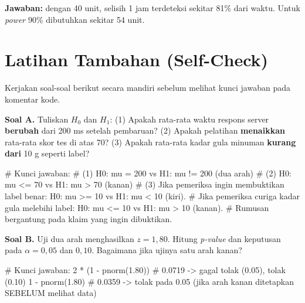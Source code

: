 \documentclass[
  indonesian,
  letterpaper,
]{book}
\newenvironment{Shaded}{\begin{snugshade}}{\end{snugshade}}
\newcommand{\CommentTok}[1]{\textcolor[rgb]{0.37,0.37,0.37}{#1}}
\newcommand{\DecValTok}[1]{\textcolor[rgb]{0.68,0.00,0.00}{#1}}
\newcommand{\FloatTok}[1]{\textcolor[rgb]{0.68,0.00,0.00}{#1}}
\newcommand{\FunctionTok}[1]{\textcolor[rgb]{0.28,0.35,0.67}{#1}}
\newcommand{\NormalTok}[1]{\textcolor[rgb]{0.00,0.23,0.31}{#1}}
\newcommand{\SpecialCharTok}[1]{\textcolor[rgb]{0.37,0.37,0.37}{#1}}
\begin{document}
\textbf{Jawaban:} dengan 40 unit, selisih 1 jam terdeteksi sekitar 81\%
dari waktu. Untuk \emph{power} 90\% dibutuhkan sekitar 54 unit.

\section{Latihan Tambahan
(Self-Check)}\label{latihan-tambahan-self-check-1}

Kerjakan soal-soal berikut secara mandiri sebelum melihat kunci jawaban
pada komentar kode.

\textbf{Soal A.} Tuliskan \(H_0\) dan \(H_1\): (1) Apakah rata-rata
waktu respons server \textbf{berubah} dari 200 ms setelah pembaruan? (2)
Apakah pelatihan \textbf{menaikkan} rata-rata skor tes di atas 70? (3)
Apakah rata-rata kadar gula minuman \textbf{kurang dari} 10 g seperti
label?

\begin{Shaded}
\begin{Highlighting}[]
\CommentTok{\# Kunci jawaban:}
\CommentTok{\# (1) H0: mu = 200 vs H1: mu != 200 (dua arah)}
\CommentTok{\# (2) H0: mu \textless{}= 70 vs H1: mu \textgreater{} 70 (kanan)}
\CommentTok{\# (3) Jika pemeriksa ingin membuktikan label benar: H0: mu \textgreater{}= 10 vs H1: mu \textless{} 10 (kiri).}
\CommentTok{\#     Jika pemeriksa curiga kadar gula melebihi label: H0: mu \textless{}= 10 vs H1: mu \textgreater{} 10 (kanan).}
\CommentTok{\#     Rumusan bergantung pada klaim yang ingin dibuktikan.}
\end{Highlighting}
\end{Shaded}

\textbf{Soal B.} Uji dua arah menghasilkan \(z = 1{,}80\). Hitung
\emph{p-value} dan keputusan pada \(\alpha = 0{,}05\) dan \(0{,}10\).
Bagaimana jika ujinya satu arah kanan?

\begin{Shaded}
\begin{Highlighting}[]
\CommentTok{\# Kunci jawaban:}
\DecValTok{2} \SpecialCharTok{*}\NormalTok{ (}\DecValTok{1} \SpecialCharTok{{-}} \FunctionTok{pnorm}\NormalTok{(}\FloatTok{1.80}\NormalTok{))   }\CommentTok{\# 0.0719 {-}\textgreater{} gagal tolak (0.05), tolak (0.10)}
\DecValTok{1} \SpecialCharTok{{-}} \FunctionTok{pnorm}\NormalTok{(}\FloatTok{1.80}\NormalTok{)         }\CommentTok{\# 0.0359 {-}\textgreater{} tolak pada 0.05 (jika arah kanan ditetapkan SEBELUM melihat data)}
\end{Highlighting}
\end{Shaded}
\end{document}

